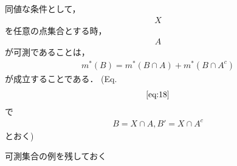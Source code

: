 \documentclass[letterpaper,10pt,english]{sphinxmanual}
\begin{document}
\sphinxAtStartPar
同値な条件として，
\begin{equation*}
\begin{split}X\end{split}
\end{equation*}
\sphinxAtStartPar
を任意の点集合とする時，
\begin{equation*}
\begin{split}A\end{split}
\end{equation*}
\sphinxAtStartPar
が可測であることは，
\begin{equation*}
\begin{split}\begin{equation}
m^{\ast}(B)=m^{\ast}(B \cap A)+m^{\ast}\left(B \cap A^{c}\right)
\label{eq:18}\tag{1.3}
\end{equation}\end{split}
\end{equation*}
\sphinxAtStartPar
が成立することである． (Eq.
\begin{equation*}
\begin{split}\eqref{eq:18}\end{split}
\end{equation*}
\sphinxAtStartPar
で
\begin{equation*}
\begin{split}B=X\cap A, B'= X\cap A^{c}\end{split}
\end{equation*}
\sphinxAtStartPar
とおく)

\sphinxAtStartPar
可測集合の例を残しておく
\end{document}
